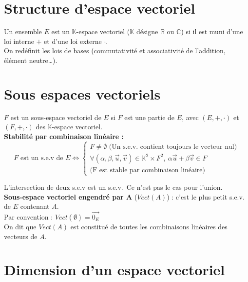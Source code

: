 \section{Structure d'espace vectoriel}\label{sec:structure-d'espace-vectoriel}
  
  Un ensemble $E$ est un $\mathbb K$-espace vectoriel ($\mathbb K$ désigne $\mathbb{R}$ ou $\mathbb{C}$) si il est muni d'une loi interne $\textbf{+}$ et d'une loi externe \textbf{$\cdot$}.\\
  
  On redéfinit les lois de bases (commutativité et associativité de l'addition, élément neutre\ldots).


\section{Sous espaces vectoriels}\label{sec:sous-espaces-vectoriels}
  
  $F$ est un sous-espace vectoriel de $E$ si $F$ est une partie de $E$, avec $(E, +, \cdot)$ et $(F, +, \cdot)$ des $\mathbb K$-espace vectoriel.\\
  
  \textbf{Stabilité par combinaison linéaire :}
  \begin{equation}
    F \text{ est un s.e.v de } E \iff
    \begin{cases}
      F \neq \emptyset \text{ (Un s.e.v. contient toujours le vecteur nul)}\\
      \forall (\alpha, \beta, \vec u, \vec v) \in \mathbb{K}^2 \times F^2,\ \alpha \vec u + \beta \vec v \in F\\
      \text{(F est stable par combinaison linéaire)}
    \end{cases}\label{eq:equation2}
  \end{equation}
  
  L'intersection de deux s.e.v est un s.e.v.\ Ce n'est pas le cas pour l'union.\\
  
  \textbf{Sous-espace vectoriel engendré par A} ($Vect(A)$) : c'est le plus petit s.e.v. de $E$ contenant $A$.\\
  Par convention : $Vect(\emptyset) = {\vec{0_E}}$\\
  On dit que $Vect(A)$ est constitué de toutes les combinaisons linéaires des vecteurs de $A$.


\section{Dimension d'un espace vectoriel}\label{sec:dimension-d'un-espace-vectoriel}
  
  
  
  